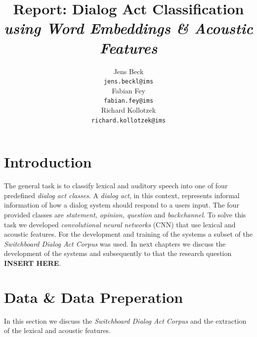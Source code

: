 \documentclass[11pt,a4paper]{article}
\title{Report: Dialog Act Classification\\\textit{using Word Embeddings \& Acoustic Features}}
\author{Jens Beck \\
  {\tt jens.beckl@ims} \\\And
  Fabian Fey \\
  {\tt fabian.fey@ims} \\\And
  Richard Kollotzek \\
  {\tt richard.kollotzek@ims} \\}
\date{}
\begin{document}
\maketitle

\begin{abstract}
\lipsum[2-2]
\end{abstract}

\section{Introduction}
The general task is to classify lexical and auditory speech into one of four predefined \textit{dialog act classes}. A \textit{dialog act}, in this context, represents informal information of how a dialog system should respond to a users input. The four provided classes are \textit{statement, opinion, question} and \textit{backchannel}. To solve this task we developed \textit{convolutional neural networks} (CNN) that use lexical and acoustic features. For the development and training of the systems a subset of the \textit{Switchboard Dialog Act Corpus} was used. In next chapters we discuss the development of the systems and subsequently to that the research question \textbf{INSERT HERE}.

\section{Data \& Data Preperation}
In this section we discuss the \textit{Switchboard Dialog Act Corpus} and the extraction of the lexical and acoustic features.
\end{document}
